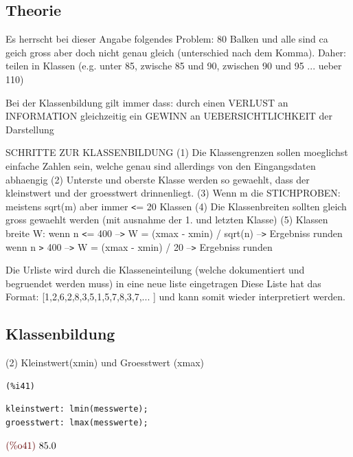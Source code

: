 \documentclass{article}
\begin{document}
\subsection{Theorie}


Es herrscht bei dieser Angabe folgendes Problem: 80 Balken und alle sind ca geich gross aber doch nicht genau gleich (unterschied nach dem Komma).
Daher: teilen in Klassen (e.g. unter 85, zwische 85 und 90, zwischen 90 und 95 ... ueber 110)

Bei der Klassenbildung gilt immer dass:
    durch einen VERLUST an INFORMATION gleichzeitig ein GEWINN an UEBERSICHTLICHKEIT der Darstellung

SCHRITTE ZUR KLASSENBILDUNG
    (1) Die Klassengrenzen sollen moeglichst einfache Zahlen sein, welche genau sind allerdings von den Eingangsdaten abhaengig
    (2) Unterste und oberste Klasse werden so gewaehlt, dass der kleinstwert und der groesstwert drinnenliegt.
    (3) Wenn m die STICHPROBEN: meistens sqrt(m) aber immer \verb|<|= 20 Klassen
    (4) Die Klassenbreiten sollten gleich gross gewaehlt werden (mit ausnahme der 1. und letzten Klasse)
    (5) Klassen breite W:   wenn n \verb|<|= 400 --\verb|>| W = (xmax - xmin) / sqrt(n) --\verb|>| Ergebniss runden
                            wenn n \verb|>| 400 --\verb|>| W = (xmax - xmin) / 20 --\verb|>| Ergebniss runden

Die Urliste wird durch die Klasseneinteilung (welche dokumentiert und begruendet werden muss) in eine neue liste eingetragen
Diese Liste hat das Format: [1,2,6,2,8,3,5,1,5,7,8,3,7,... ] und kann somit wieder interpretiert werden.

\subsection{Klassenbildung}


(2)
Kleinstwert(xmin) und Groesstwert (xmax)

\noindent
\begin{minipage}[t]{8ex}{\color{red}\bf
\begin{verbatim}
(%i41) 
\end{verbatim}}
\end{minipage}
\begin{minipage}[t]{\textwidth}{\color{blue}
\begin{verbatim}
kleinstwert: lmin(messwerte);
groesstwert: lmax(messwerte);
\end{verbatim}}
\end{minipage}
\begin{math}\displaystyle
\parbox{8ex}{\color{labelcolor}(\%o41) }
85.0
\end{math}
\end{document}

